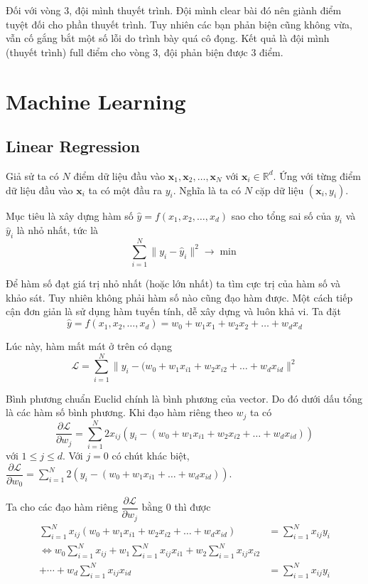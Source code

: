 \documentclass{mynotes}
\newcommand{\RR}{\mathbb{R}}
\begin{document}
Đối với vòng 3, đội mình thuyết trình. Đội mình clear bài đó nên giành điểm tuyệt đối cho phần thuyết trình. Tuy nhiên các bạn phản biện cũng không vừa, vẫn cố gắng bắt một số lỗi do trình bày quá cô đọng. Kết quả là đội mình (thuyết trình) full điểm cho vòng 3, đội phản biện được 3 điểm.



\chapter{Machine Learning}

\section{Linear Regression}

Giả sử ta có $N$ điểm dữ liệu đầu vào $\bm{x}_1, \bm{x}_2, \ldots, \bm{x}_N$ với $\bm{x}_i \in \RR^d$. Ứng với từng điểm dữ liệu đầu vào $\bm{x}_i$ ta có một đầu ra $y_i$. Nghĩa là ta có $N$ cặp dữ liệu $(\bm{x}_i, y_i)$.

Mục tiêu là xây dựng hàm số $\hat{y} = f(x_1, x_2, \ldots, x_d)$ sao cho tổng sai số của $y_i$ và $\hat{y}_i$ là nhỏ nhất, tức là \[ \sum_{i=1}^N \lVert y_i - \hat{y}_i \rVert^2 \to \min \]

Để hàm số đạt giá trị nhỏ nhất (hoặc lớn nhất) ta tìm cực trị của hàm số và khảo sát. Tuy nhiên không phải hàm số nào cũng đạo hàm được. Một cách tiếp cận đơn giản là sử dụng hàm tuyến tính, dễ xây dựng và luôn khả vi. Ta đặt \[ \hat{y} = f(x_1, x_2, \ldots, x_d) = w_0 + w_1 x_1 + w_2 x_2 + \ldots + w_d x_d \]

Lúc này, hàm mất mát ở trên có dạng \[ \mathcal{L} = \sum_{i=1}^N \lVert y_i - (w_0 + w_1 x_{i1} + w_2 x_{i2} + \ldots + w_d x_{id} \rVert^2 \]

Bình phương chuẩn Euclid chính là bình phương của vector. Do đó dưới dấu tổng là các hàm số bình phương. Khi đạo hàm riêng theo $w_j$ ta có \[ \dfrac{\partial \mathcal{L}}{\partial w_j} = \sum_{i=1}^N 2 x_{ij} (y_i - (w_0 + w_1 x_{i1} + w_2 x_{i2} + \ldots + w_d x_{id})) \] với $1 \leq j \leq d$. Với $j = 0$ có chút khác biệt, $\dfrac{\partial \mathcal{L}}{\partial w_0} = \sum_{i=1}^N 2 (y_i - (w_0 + w_1 x_{i1} + \ldots + w_d x_{id}))$.

Ta cho các đạo hàm riêng $\dfrac{\partial \mathcal{L}}{\partial w_j}$ bằng 0 thì được
\begin{align*}
    \sum_{i=1}^N x_{ij} (w_0 + w_1 x_{i1} + w_2 x_{i2} + \ldots + w_d x_{id}) & = \sum_{i=1}^N x_{ij} y_i \\ \Leftrightarrow w_0 \sum_{i=1}^N x_{ij} + w_1 \sum_{i=1}^N x_{ij} x_{i1} + w_2 \sum_{i=1}^N x_{ij} x_{i2} \\ + \cdots + w_d \sum_{i=1}^N x_{ij} x_{id} & = \sum_{i=1}^N x_{ij} y_i
\end{align*}
\end{document}
